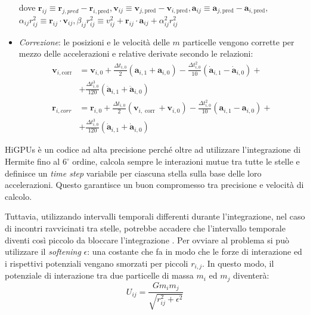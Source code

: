 \begin{itemize}
dove $\mathbf{r}_{i j} \equiv \mathbf{r}_{j, p r e d}-\mathbf{r}_{i, \text {pred}}, \mathbf{v}_{i j} \equiv \mathbf{v}_{j, \text {pred}}-\mathbf{v}_{i, \text {pred}}, \mathbf{a}_{i j} \equiv \mathbf{a}_{j, \text {pred}}-\mathbf{a}_{i, \text {pred}},$
$\alpha_{i j} r_{i j}^{2} \equiv \mathbf{r}_{i j} \cdot \mathbf{v}_{i j}, \beta_{i j} r_{i j}^{2} \equiv v_{i j}^{2}+\mathbf{r}_{i j} \cdot \mathbf{a}_{i j}+\alpha_{i j}^{2} r_{i j}^{2}$
    \item \textit{Correzione}: le posizioni e le velocità delle $m$ particelle vengono corrette per mezzo delle accelerazioni e relative derivate secondo le relazioni:
    \begin{equation}
\begin{aligned}
\mathbf{v}_{i, \text {corr}} &=\mathbf{v}_{i, 0}+\frac{\Delta t_{i, 0}}{2}\left(\mathbf{a}_{i, 1}+\mathbf{a}_{i, 0}\right)-\frac{\Delta t_{i, 0}^{2}}{10}\left(\dot{\mathbf{a}}_{i, 1}-\dot{\mathbf{a}}_{i, 0}\right)+\\
&+\frac{\Delta t_{i, 0}^{3}}{120}\left(\ddot{\mathbf{a}}_{i, 1}+\ddot{\mathbf{a}}_{i, 0}\right) \\
\mathbf{r}_{i, c o r r} &=\mathbf{r}_{i, 0}+\frac{\Delta t_{i, 0}}{2}\left(\mathbf{v}_{i, \operatorname{corr}}+\mathbf{v}_{i, 0}\right)-\frac{\Delta t_{i, 0}^{2}}{10}\left(\mathbf{a}_{i, 1}-\mathbf{a}_{i, 0}\right)+\\
&+\frac{\Delta t_{i, 0}^{3}}{120}\left(\dot{\mathbf{a}}_{i, 1}+\dot{\mathbf{a}}_{i, 0}\right)
\end{aligned}
\label{eq:correz}
\end{equation}
\end{itemize}

HiGPUs è un codice ad alta precisione perché oltre ad utilizzare l'integrazione di Hermite fino al $6^{\circ}$ ordine, calcola sempre le interazioni mutue tra tutte le stelle e definisce un \textit{time step} variabile per ciascuna stella sulla base delle loro accelerazioni. Questo garantisce un buon compromesso tra precisione e velocità di calcolo. 

Tuttavia, utilizzando intervalli temporali differenti durante l’integrazione, nel caso di incontri ravvicinati tra stelle, potrebbe accadere che l’intervallo temporale diventi così piccolo da bloccare l’integrazione . Per ovviare al problema si può utilizzare il \textit{softening} $\epsilon$: una costante che fa in modo che le forze di interazione ed i rispettivi potenziali vengano smorzati per piccoli \textit{$r_{i,j}$}. In questo modo, il potenziale di interazione tra due particelle di massa $m_{i}$ ed $m_{j}$ diventerà:
\begin{equation}
U_{i j}=\frac{G m_{i} m_{j}}{\sqrt{r_{i j}^{2}+\epsilon^{2}}}
\label{eq:soft}
\end{equation}

